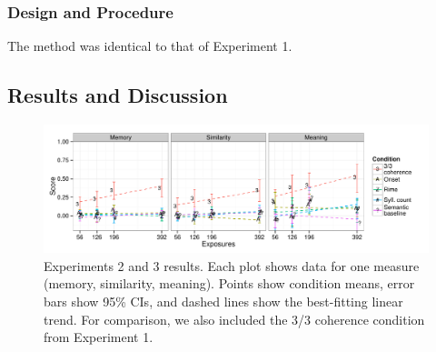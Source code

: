 \documentclass[man,floatsintext]{apa6}
\begin{document}
\subsubsection{Design and Procedure}
The method was identical to that of Experiment 1.

\subsection{Results and Discussion}

\begin{figure}[t]
  \begin{center}
    \includegraphics[width=1.0\linewidth]{x23.pdf}
    \caption{Experiments 2 and 3 results. Each plot shows data for one
      measure (memory, similarity, meaning). Points show condition means,
      error bars show 95\% CIs, and dashed lines show the best-fitting
      linear trend. For comparison, we also included the 3/3 coherence
      condition from Experiment 1.}
    \label{expt23-results}
  \end{center}
\end{figure}
\end{document}
